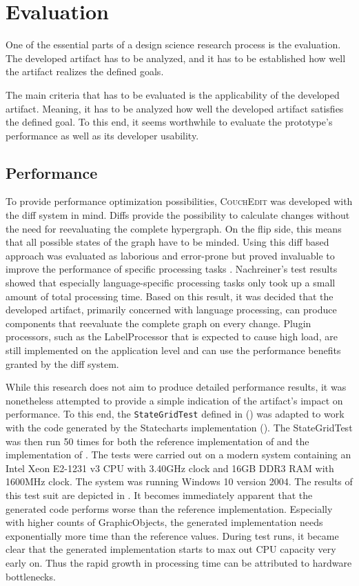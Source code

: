 \chapter{Evaluation}
\label{ch:evaluation}
One of the essential parts of a design science research process is the evaluation. The developed artifact has to be analyzed, and it has to be established how well the artifact realizes the defined goals.

The main criteria that has to be evaluated is the applicability of the developed artifact. Meaning, it has to be analyzed how well the developed artifact satisfies the defined goal. To this end, it seems worthwhile to evaluate the prototype's performance as well as its developer usability.

\section{Performance}
\label{sec:performance}
To provide performance optimization possibilities, \textsc{CouchEdit} was developed with the diff system in mind. Diffs provide the possibility to calculate changes without the need for reevaluating the complete hypergraph. On the flip side, this means that all possible states of the graph have to be minded. Using this diff based approach was evaluated as laborious and error-prone but proved invaluable to improve the performance of specific processing tasks \cite{nachreiner_couchedit_2020}. Nachreiner's test results showed that especially language-specific processing tasks only took up a small amount of total processing time. Based on this result, it was decided that the developed artifact, primarily concerned with language processing, can produce components that reevaluate the complete graph on every change. Plugin processors, such as the LabelProcessor that is expected to cause high load, are still implemented on the application level and can use the performance benefits granted by the diff system.

While this research does not aim to produce detailed performance results, it was nonetheless attempted to provide a simple indication of the artifact's impact on performance. To this end, the \texttt{StateGridTest} defined in \cite{nachreiner_couchedit_2020} () was adapted to work with the code generated by the Statecharts implementation (). The StateGridTest was then run 50 times for both the reference implementation of \cite{nachreiner_couchedit_2020} and the implementation of . The tests were carried out on a modern system containing an Intel Xeon E2-1231 v3 CPU with 3.40GHz clock and 16GB DDR3 RAM with 1600MHz clock. The system was running Windows 10 version 2004. The results of this test suit are depicted in . It becomes immediately apparent that the generated code performs worse than the reference implementation. Especially with higher counts of GraphicObjects, the generated implementation needs exponentially more time than the reference values. During test runs, it became clear that the generated implementation starts to max out CPU capacity very early on. Thus the rapid growth in processing time can be attributed to hardware bottlenecks. 

